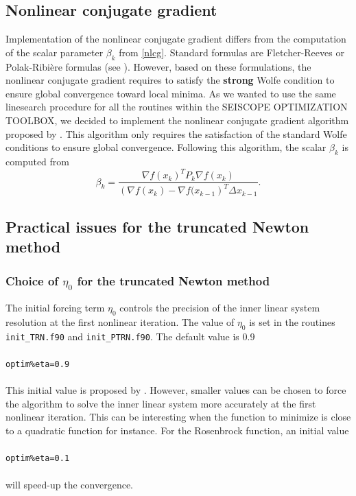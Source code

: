 \documentclass[a4paper,twoside,final,onecolumn,11pt,openright]{article}
\begin{document}
\subsection{Nonlinear conjugate gradient}

Implementation of the nonlinear conjugate gradient differs from the computation of the scalar parameter $\beta_k$ from \eqref{nlcg}. Standard formulas are Fletcher-Reeves or Polak-Ribi\`ere formulas (see \citet{Nocedal_2006_NO}). However, based on these formulations, the nonlinear conjugate gradient requires to satisfy the \textbf{strong} Wolfe condition to ensure global convergence toward local minima. As we wanted to use the same linesearch procedure for all the routines within the SEISCOPE OPTIMIZATION TOOLBOX, we decided to implement the nonlinear conjugate gradient algorithm proposed by \citet{DAI_1999_NCG}. This algorithm only requires the satisfaction of the standard Wolfe conditions to ensure global convergence. Following this algorithm, the scalar $\beta_k$ is computed from
\begin{equation}
 \beta_{k}=\frac{\nabla f(x_k)^{T}P_{k}\nabla f(x_k)}{\left(\nabla f(x_k)-\nabla f(x_{k-1}\right)^{T}\Delta x_{k-1}}.
\end{equation} 

\subsection{Practical issues for the truncated Newton method}

\subsubsection{Choice of $\eta_0$ for the truncated Newton method}

The initial forcing term $\eta_0$ controls the precision of the inner linear system resolution at the first nonlinear iteration. The value of $\eta_0$ is set in the routines \texttt{init\_TRN.f90} and \texttt{init\_PTRN.f90}. The default value is $0.9$
\\
\\
\texttt{optim\%eta=0.9}
\\
\\
This initial value is proposed by \citet{Eisenstat_1994_TRN}. However, smaller values can be chosen to force the algorithm to solve the inner linear system more accurately at the first nonlinear iteration. This can be interesting when the function to minimize is close to a quadratic function for instance. For the Rosenbrock function, an initial value 
\\
\\
\texttt{optim\%eta=0.1}
\\
\\
will speed-up the convergence. 
\end{document}
